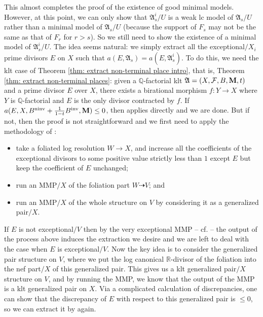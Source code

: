\documentclass[12pt]{amsart}
\numberwithin{equation}{section}
\newcommand{\Mm}{{\bf{M}}}
\newcommand{\ninv}{\operatorname{ninv}}
\newcommand{\inv}{\operatorname{inv}}
\newcommand{\Aa}{{\mathfrak{A}}}
\newcommand{\Ff}{\mathcal{F}}
\theoremstyle{definition}
\theoremstyle{definition}
\theoremstyle{definition}
\begin{document}
This almost completes the proof of the existence of good minimal models. However, at this point, we can only show that $\Aa^i_s/U$ is a weak lc model of $\Aa_s/U$ rather than a minimal model of $\Aa_s/U$ (because the support of $F_s$ may not be the same as that of $F_r$ for $r>s$). So we still need to show the existence of a minimal model of $\Aa^i_s/U$. The idea seems natural: we simply extract all 
the exceptional$/X_i$ prime divisors $E$ on $X$ such that $a(E,\Aa_s)=a(E,\Aa^i_s)$. To do this, we need the klt case of Theorem \ref{thm: extract non-terminal place intro}, that is, Theorem \ref{thm: 
extract non-terminal places}: given a $\mathbb Q$-factorial klt $\Aa=(X,\Ff,B,\Mm,t)$ and a prime divisor $E$ over $X$, there exists a birational morphism $f\colon  Y\rightarrow X$ where $Y$ is 
$\mathbb Q$-factorial and $E$ is the only divisor contracted by $f$. If $a(E,X,B^{\ninv}+\frac{1}{1-t}B^{\inv},\Mm)\leq 0$, then \cite[Lemma 4.6]{BZ16} applies directly and we are done. But if not, 
then the proof is not straightforward and we first need to apply the methodology of \cite{CHLMSSX24}: 
\begin{itemize}
    \item take a foliated log resolution $W\rightarrow X$, and increase all the coefficients of the exceptional divisors to some positive value strictly less than $1$ except $E$ but keep the coefficient of $E$ unchanged;
    \item run an MMP$/X$ of the foliation part $W\dashrightarrow V$; and
    \item run an MMP$/X$ of the whole structure on $V$ by considering it as a generalized pair$/X$.
\end{itemize}
If $E$ is not exceptional$/V$ then by the very exceptional MMP -- cf. \cite[Lemma 3.4]{Bir12} -- the output of the process above induces the extraction we desire and we are left to deal with the case when $E$ is exceptional$/V$. Now the key idea is to consider the generalized pair structure on $V$, where we put the log canonical $\mathbb R$-divisor of the foliation into the nef part$/X$ of this generalized pair. This gives us a klt generalized pair$/X$ structure on $V$, and by running the MMP, we know that the output of the MMP is a klt generalized pair on $X$. Via a complicated calculation of discrepancies, one can show that the discrepancy of $E$ with respect to this generalized pair is $\leq 0$, so we can extract it by \cite[Lemma 4.6]{BZ16} again.
\end{document}
